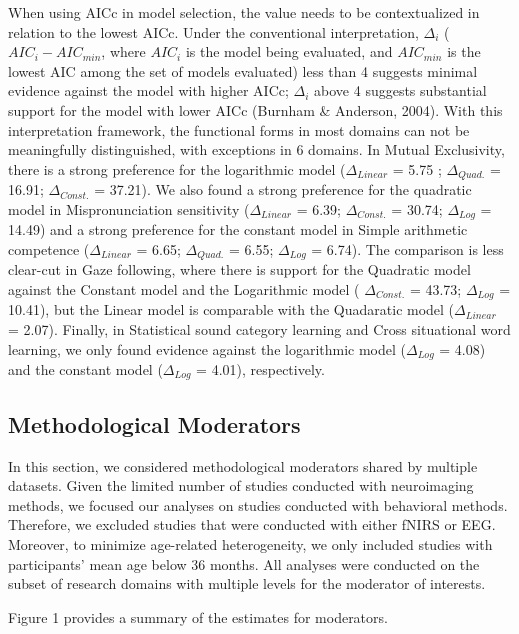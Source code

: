 \documentclass[10pt, letterpaper]{article}
\begin{document}
When using AICc in model selection, the value needs to be contextualized
in relation to the lowest AICc. Under the conventional interpretation,
\(\Delta_{i}\) (\(AIC_i - AIC_{min}\), where \(AIC_i\) is the model
being evaluated, and \(AIC_{min}\) is the lowest AIC among the set of
models evaluated) less than 4 suggests minimal evidence against the
model with higher AICc; \(\Delta_{i}\) above 4 suggests substantial
support for the model with lower AICc (Burnham \& Anderson, 2004). With
this interpretation framework, the functional forms in most domains can
not be meaningfully distinguished, with exceptions in 6 domains. In
Mutual Exclusivity, there is a strong preference for the logarithmic
model (\(\Delta_{Linear}\) = 5.75 ; \(\Delta_{Quad.}\) = 16.91;
\(\Delta_{Const.}\) = 37.21). We also found a strong preference for the
quadratic model in Mispronunciation sensitivity (\(\Delta_{Linear}\) =
6.39; \(\Delta_{Const.}\) = 30.74; \(\Delta_{Log}\) = 14.49) and a
strong preference for the constant model in Simple arithmetic competence
(\(\Delta_{Linear}\) = 6.65; \(\Delta_{Quad.}\) = 6.55; \(\Delta_{Log}\)
= 6.74). The comparison is less clear-cut in Gaze following, where there
is support for the Quadratic model against the Constant model and the
Logarithmic model ( \(\Delta_{Const.}\) = 43.73; \(\Delta_{Log}\) =
10.41), but the Linear model is comparable with the Quadaratic model
(\(\Delta_{Linear}\) = 2.07). Finally, in Statistical sound category
learning and Cross situational word learning, we only found evidence
against the logarithmic model (\(\Delta_{Log}\) = 4.08) and the constant
model (\(\Delta_{Log}\) = 4.01), respectively.

\hypertarget{methodological-moderators}{%
\subsection{Methodological Moderators}\label{methodological-moderators}}

In this section, we considered methodological moderators shared by
multiple datasets. Given the limited number of studies conducted with
neuroimaging methods, we focused our analyses on studies conducted with
behavioral methods. Therefore, we excluded studies that were conducted
with either fNIRS or EEG. Moreover, to minimize age-related
heterogeneity, we only included studies with participants' mean age
below 36 months. All analyses were conducted on the subset of research
domains with multiple levels for the moderator of interests.

Figure 1 provides a summary of the estimates for moderators.
\end{document}
